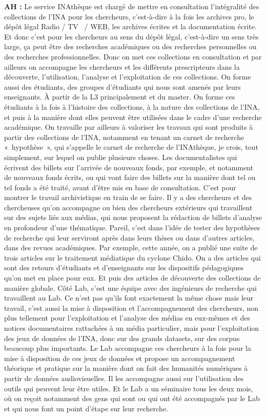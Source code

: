 \textbf{AH :} Le service INAthèque est chargé de mettre en consultation l'intégralité des collections de l'INA pour les chercheurs, c'est-à-dire à la fois les archives pro, le dépôt légal Radio / TV  / WEB, les archives écrites et la documentation écrite. Et donc c'est pour les chercheurs au sens du dépôt légal, c'est-à-dire un sens très large, ça peut être des recherches académiques ou des recherches personnelles ou des recherches professionnelles.  Donc on met ces collections en consultation et par ailleurs on accompagne les chercheurs et les différents prescripteurs dans la découverte, l'utilisation, l'analyse et l'exploitation de ces collections. On forme aussi des étudiants, des groupes d'étudiants qui nous sont amenés par leurs enseignants. À partir de la L3 principalement et du master. On forme ces étudiants à la fois à l'histoire des collections, à la nature des collections de l'INA, et puis à la manière dont elles peuvent être utilisées dans le cadre d'une recherche académique. On travaille par ailleurs à valoriser les travaux qui sont produits à partir des collections de l'INA, notamment en tenant un carnet de recherche « hypothèse », qui s'appelle le carnet de recherche de l’INAthèque, je crois, tout simplement, sur lequel on publie plusieurs choses. Les documentalistes qui écrivent des billets sur l'arrivée de nouveaux fonds, par exemple, et notamment de nouveaux fonds écrits, ou qui vont faire des billets sur la manière dont tel ou tel fonds a été traité, avant d'être mis en base de consultation. C’est pour montrer le travail archivistique en train de se faire. Il y a des chercheurs et des chercheuses qu'on accompagne ou bien des chercheurs extérieurs qui travaillent sur des sujets liés aux médias, qui nous proposent la rédaction de billets d'analyse en profondeur d'une thématique. Pareil, c'est dans l'idée de tester des hypothèses de recherche qui leur serviront après dans leurs thèses ou dans d'autres articles, dans des revues académiques. Par exemple, cette année, on a publié une suite de trois articles sur le traitement médiatique du cyclone Chido. On a des articles qui sont des retours d'étudiants et d'enseignants sur les dispositifs pédagogiques qu'on met en place pour eux.  Et puis des articles de découverte des collections de manière globale. Côté Lab, c'est une équipe avec des ingénieurs de recherche qui travaillent au Lab. Ce n'est pas qu'ils font exactement la même chose mais leur travail, c'est aussi la mise à disposition et l'accompagnement des chercheurs, non plus tellement pour l'exploitation et l'analyse des médias en eux-mêmes et des notices documentaires rattachées à un média particulier, mais pour l'exploitation des jeux de données de l'INA, donc sur des grands datasets, sur des corpus beaucoup plus importants.  Le Lab accompagne ces chercheurs à la fois pour la mise à disposition de ces jeux de données et propose un accompagnement théorique et pratique sur la manière dont on fait des humanités numériques à partir de données audiovisuelles. Il les accompagne aussi sur l'utilisation des outils qui peuvent leur être utiles. Et le Lab a un séminaire tous les deux mois, où on reçoit notamment des gens qui sont ou qui ont été accompagnés par le Lab et qui nous font un point d'étape sur leur recherche.

